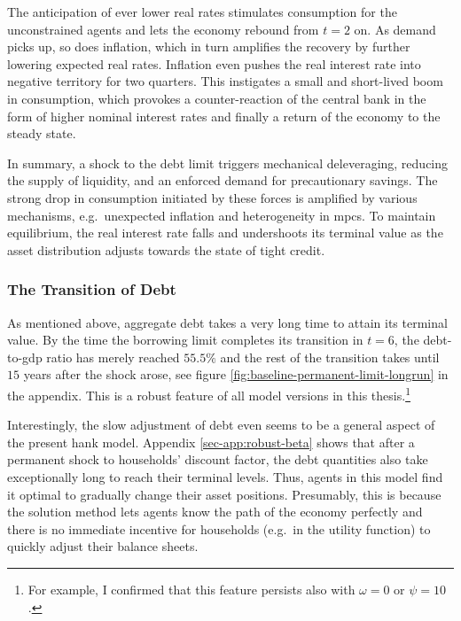 \documentclass[a4paper,12pt]{article} %
\numberwithin{equation}{section} %
\numberwithin{figure}{section}
\numberwithin{table}{section}
\begin{document}
The anticipation of ever lower real rates stimulates consumption for the unconstrained agents and lets the economy rebound from $t=2$ on. As demand picks up, so does inflation, which in turn amplifies the recovery by further lowering expected real rates. Inflation even pushes the real interest rate into negative territory for two quarters. This instigates a small and short-lived boom in consumption, which provokes a counter-reaction of the central bank in the form of higher nominal interest rates and finally a return of the economy to the steady state.

In summary, a shock to the debt limit triggers mechanical deleveraging, reducing the supply of liquidity, and an enforced demand for precautionary savings. The strong drop in consumption initiated by these forces is amplified by various mechanisms, e.g.~unexpected inflation and heterogeneity in \Gls{mpc}s. To maintain equilibrium, the real interest rate falls and undershoots its terminal value as the asset distribution adjusts towards the state of tight credit.

\subsubsection{The Transition of Debt}
\label{sec:limit-transition-debt}

As mentioned above, aggregate debt takes a very long time to attain its terminal value. By the time the borrowing limit completes its transition in $t=6$, the debt-to-\Gls{gdp} ratio has merely reached $55.5\%$ and the rest of the transition takes until $15$ years after the shock arose, see figure \ref{fig:baseline-permanent-limit-longrun} in the appendix. This is a robust feature of all model versions in this thesis.\footnote{For example, I confirmed that this feature persists also with $\omega = 0$ or $\psi = 10$.}

Interestingly, the slow adjustment of debt even seems to be a general aspect of the present \Gls{hank} model. Appendix \ref{sec-app:robust-beta} shows that after a permanent shock to households' discount factor, the debt quantities also take exceptionally long to reach their terminal levels. Thus, agents in this model find it optimal to gradually change their asset positions. Presumably, this is because the solution method lets agents know the path of the economy perfectly and there is no immediate incentive for households (e.g.~in the utility function) to quickly adjust their balance sheets.
\end{document}
